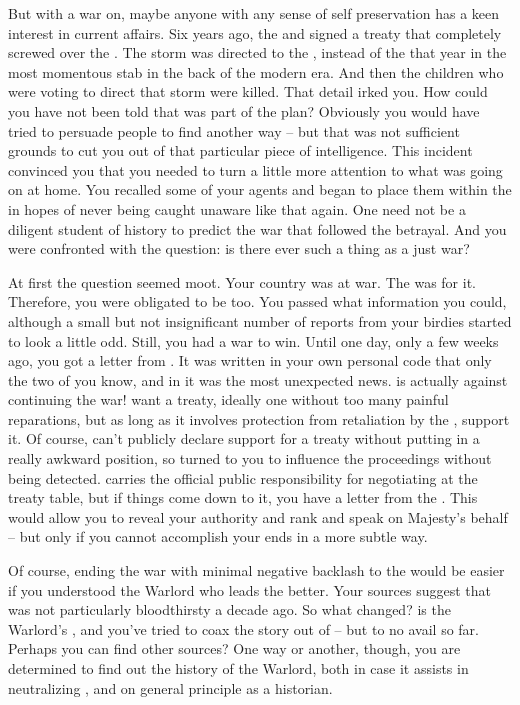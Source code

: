 \documentclass[char]{GL2020}
\begin{document}
But with a war on, maybe anyone with any sense of self preservation has a keen interest in current affairs. Six years ago, the \pFarm{} and \pTech{} signed a treaty that completely screwed over the \pShippies{}. The storm was directed to the \pShip{}, instead of the \pTech{} that year in the most momentous stab in the back of the modern era. And then the children who were voting to direct that storm were killed. That detail irked you. How could you have not been told that was part of the plan? Obviously you would have tried to persuade people to find another way -- but that was not sufficient grounds to cut you out of that particular piece of intelligence. This incident convinced you that you needed to turn a little more attention to what was going on at home. You recalled some of your agents and began to place them within the \pFarm{} in hopes of never being caught unaware like that again. One need not be a diligent student of history to predict the war that followed the betrayal. And you were confronted with the question: is there ever such a thing as a just war?

At first the question seemed moot. Your country was at war. The \cQueen{\Majesty} was for it. Therefore, you were obligated to be too. You passed what information you could, although a small but not insignificant number of reports from your birdies started to look a little odd. Still, you had a war to win. Until one day, only a few weeks ago, you got a letter from \cQueen{} \cQueen{\themself}. It was written in your own personal code that only the two of you know, and in it was the most unexpected news. \cQueen{} is actually against continuing the war! \cQueen{\They} want a treaty, ideally one without too many painful reparations, but as long as it involves protection from retaliation by the \pTech{}, \cQueen{\they} support it. Of course, \cQueen{} can’t publicly declare \cQueen{\their} support for a treaty without putting \pFarm{} in a really awkward position, so \cQueen{\they} \cQueen{\have} turned to you to influence the proceedings without being detected. \cEvil{} carries the official public responsibility for negotiating at the treaty table, but if things come down to it, you have a letter from the \cQueen{\Majesty}. This would allow you to reveal your authority and rank and speak on \cQueen{\their} Majesty’s behalf -- but only if you cannot accomplish your ends in a more subtle way.

Of course, ending the war with minimal negative backlash to the \pFarm{} would be easier if you understood the Warlord who leads the \pShip{} better. Your sources suggest that \cLoud{\full} was not particularly bloodthirsty a decade ago. So what changed? \cWarlordDaughter{} is the Warlord’s \cWarlordDaughter{\child}, and you’ve tried to coax the story out of \cWarlordDaughter{\them} -- but to no avail so far. Perhaps you can find other sources? One way or another, though, you are determined to find out the history of the Warlord, both in case it assists in neutralizing \cLoud{\them}, and on general principle as a historian.
\end{document}
